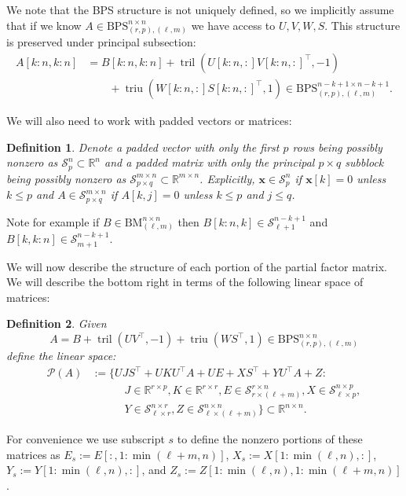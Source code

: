 \documentclass[a4paper,fleqn]{cas-sc}
\newtheorem{definition}{Definition}
\def\bbR{{\mathbb R}}
\def\BM{{\mathrm{BM}}_{(\ell,m)}^{n \times n}}
\def\BPS{{\mathrm{BPS}}_{(r,p),(\ell,m)}^{n \times n}}
\def\calP{{\mathcal P}}
\def\calS{{\mathcal S}}
\def\bfx{{\mathbf x}}
\DeclareMathOperator{\triu}{triu}
\DeclareMathOperator{\tril}{tril}
\begin{document}
We note that the BPS structure is not uniquely defined, so we implicitly assume that if we know $A \in \BPS$ we have access to $U,V,W,S$. This structure is preserved under principal subsection:
\begin{align*}
A[k\!:\!n, k\!:\!n] &= B[k\!:\!n, k\!:\!n]
+
\tril(U[k\!:\!n, :]V[k\!:\!n, :]^\top,-1) \\
&\qquad +
\triu(W[k\!:\!n, :]S[k\!:\!n, :]^\top,1) \in {\mathrm{BPS}}_{(r,p),(\ell,m)}^{n-k+1 \times n-k+1}.
\end{align*}

We will also need to work with padded vectors or matrices:

\begin{definition}
Denote a {\it padded vector} with only the first $p$ rows being possibly nonzero as $\calS_p^n \subset \bbR^n$ and a {\it padded matrix} with only the principal $p \times q$ subblock being possibly nonzero as $\calS_{p \times q}^{m \times n} \subset \bbR^{m \times n}$. Explicitly, $\bfx \in \calS_p^n$ if $\bfx[k] = 0$ unless $k \leq p$ and $A \in \calS_{p \times q}^{m \times n}$ if $A[k,j] = 0$ unless $k \leq p$ and $j \leq q$.
\end{definition}

Note for example if $B \in \BM$ then $B[k\!:\!n,k] \in \calS_{\ell+1}^{n-k+1}$ and $B[k,k\!:\!n] \in \calS_{m+1}^{n-k+1}$.


We will now describe the structure of each portion of the partial factor matrix. We will describe the bottom right in terms of the following linear space of matrices:

\begin{definition} \label{def:P}
Given
\[
A = B + \tril(UV^\top, -1) + \triu(WS^\top, 1)  \in \BPS
\]
define the linear space:
\begin{align*}
\calP(A) &:= \bigg\{
UJS^\top + UKU^\top A + UE + XS^\top + YU^\top A + Z :\\
&\qquad\quad  J \in \mathbb{R}^{r\times p}, K \in \mathbb{R}^{r\times r},  E \in \calS_{r\times (\ell+m)}^{r \times n},  X \in \calS_{\ell \times p}^{n \times p}, \\
 &\qquad\quad  Y \in \calS_{\ell \times r}^{n \times r}, Z \in \calS_{\ell \times (\ell+m)}^{n \times n}
\bigg\} \subset \bbR^{n \times n}.
\end{align*}
\end{definition}

For convenience we use subscript $s$ to define the nonzero portions of these matrices as $E_s:=E[:,1:\min(\ell+m,n)]$, $X_s:=X[1:\min(\ell,n),:]$, $Y_s:=Y[1:\min(\ell,n),:]$, and $Z_s:=Z[1:\min(\ell,n),1:\min(\ell+m,n)]$.
\end{document}
